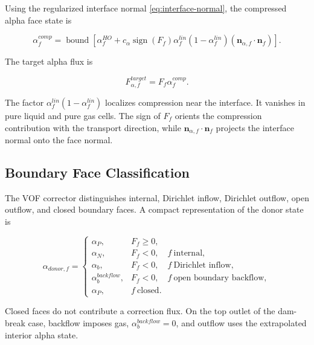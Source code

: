 \documentclass[11pt]{article}
\newcommand{\bnd}{\operatorname{bound}}
\newcommand{\sign}{\operatorname{sign}}
\begin{document}
Using the regularized interface normal \eqref{eq:interface-normal}, the
compressed alpha face state is

\begin{equation}
  \alpha_f^{comp}
  =
  \bnd
  \left[
    \alpha_f^{HO}
    +
    c_\alpha
    \sign(F_f)
    \alpha_f^{lin}(1-\alpha_f^{lin})
    \left(\mathbf{n}_{\alpha,f}\cdot\mathbf{n}_f\right)
  \right].
  \label{eq:compressed-alpha}
\end{equation}

The target alpha flux is

\begin{equation}
  F_{\alpha,f}^{target}
  =
  F_f\alpha_f^{comp}.
  \label{eq:target-alpha-flux}
\end{equation}

The factor \(\alpha_f^{lin}(1-\alpha_f^{lin})\) localizes compression near the
interface.  It vanishes in pure liquid and pure gas cells.  The sign of \(F_f\)
orients the compression contribution with the transport direction, while
\(\mathbf{n}_{\alpha,f}\cdot\mathbf{n}_f\) projects the interface normal onto
the face normal.

\subsection{Boundary Face Classification}

The VOF corrector distinguishes internal, Dirichlet inflow, Dirichlet outflow,
open outflow, and closed boundary faces.  A compact representation of the donor
state is

\begin{equation}
  \alpha_{donor,f}
  =
  \begin{cases}
    \alpha_P,
      & F_f\ge 0,\\
    \alpha_N,
      & F_f<0,\quad f\ \text{internal},\\
    \alpha_b,
      & F_f<0,\quad f\ \text{Dirichlet inflow},\\
    \alpha_b^{backflow},
      & F_f<0,\quad f\ \text{open boundary backflow},\\
    \alpha_P,
      & f\ \text{closed}.
  \end{cases}
\end{equation}

Closed faces do not contribute a correction flux.  On the top outlet of the
dam-break case, backflow imposes gas, \(\alpha_b^{backflow}=0\), and outflow
uses the extrapolated interior alpha state.
\end{document}
